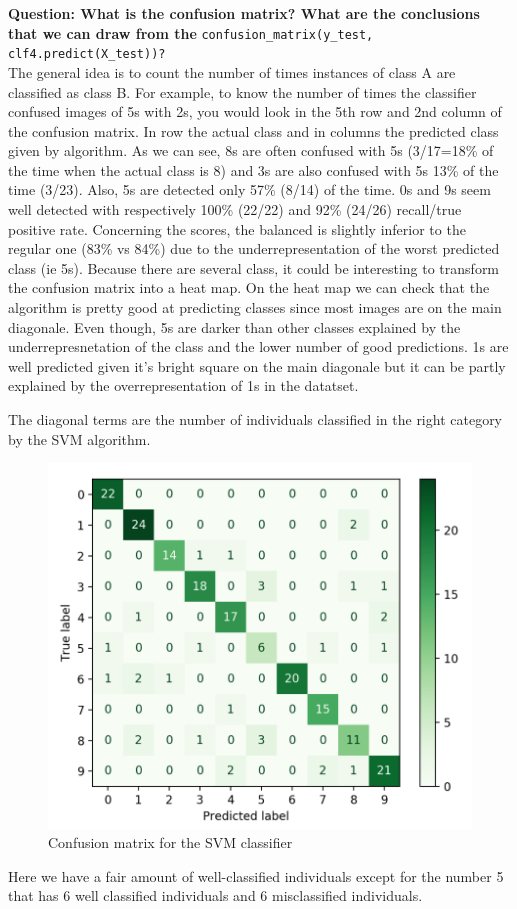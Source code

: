 \textbf{Question: What is the confusion matrix? What are the conclusions that we can draw from the} \verb|confusion_matrix(y_test, clf4.predict(X_test))?| \\

The general idea is to count the number of times instances of class A are classified as class B. For example, to know the number of times the classifier confused images of 5s with 2s, you would look in the 5th row and 2nd column of the confusion
matrix. In row the actual class and in columns the predicted class given by algorithm.
As we can see, 8s are often confused with 5s (3/17=18\% of the time when the actual class is 8) and 3s are also confused with 5s 13\% of the time (3/23). Also, 5s are detected only 57\% (8/14) of the time. 0s and 9s seem well detected with respectively 100\% (22/22) and 92\% (24/26) recall/true positive rate.
Concerning the scores, the balanced is slightly inferior to the regular one (83\% vs 84\%) due to the underrepresentation of the worst predicted class (ie 5s).
Because there are several class, it could be interesting to transform the confusion matrix into a heat map. 
On the heat map we can check that the algorithm is pretty good at predicting classes since most images are on the main diagonale. Even though, 5s are darker than other classes explained by the underrepresnetation of the class and the lower number of good predictions. 1s are well predicted given it's bright square on the main diagonale but it can be partly explained by the overrepresentation of 1s in the datatset. 

The diagonal terms are the number of individuals classified in the right category by the SVM algorithm. 

\begin{figure}[h]
	\centering 
	\includegraphics[scale=0.6]{Pics/confusion_matrix}
	\caption{Confusion matrix for the SVM classifier}
	\label{fig:probas}
\end{figure}

Here we have a fair amount of well-classified individuals except for the number 5 that has 6 well classified individuals and 6 misclassified individuals. 
